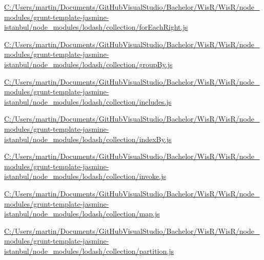 \begin{DoxyCompactItemize}
\item 
\hyperlink{_c_1_2_users_2martin_2_documents_2_git_hub_visual_studio_2_bachelor_2_wis_r_2_wis_r_2node_module4e21f2b488b14f7d27ff100a4e449020}{C\+:/\+Users/martin/\+Documents/\+Git\+Hub\+Visual\+Studio/\+Bachelor/\+Wis\+R/\+Wis\+R/node\+\_\+modules/grunt-\/template-\/jasmine-\/istanbul/node\+\_\+modules/lodash/collection/for\+Each\+Right.\+js}
\item 
\hyperlink{_c_1_2_users_2martin_2_documents_2_git_hub_visual_studio_2_bachelor_2_wis_r_2_wis_r_2node_modulebb2605923cf83369f244132dd77857ae}{C\+:/\+Users/martin/\+Documents/\+Git\+Hub\+Visual\+Studio/\+Bachelor/\+Wis\+R/\+Wis\+R/node\+\_\+modules/grunt-\/template-\/jasmine-\/istanbul/node\+\_\+modules/lodash/collection/group\+By.\+js}
\item 
\hyperlink{_c_1_2_users_2martin_2_documents_2_git_hub_visual_studio_2_bachelor_2_wis_r_2_wis_r_2node_moduleaa2cefc786c7d8a6bf6cf943f6676680}{C\+:/\+Users/martin/\+Documents/\+Git\+Hub\+Visual\+Studio/\+Bachelor/\+Wis\+R/\+Wis\+R/node\+\_\+modules/grunt-\/template-\/jasmine-\/istanbul/node\+\_\+modules/lodash/collection/includes.\+js}
\item 
\hyperlink{_c_1_2_users_2martin_2_documents_2_git_hub_visual_studio_2_bachelor_2_wis_r_2_wis_r_2node_module82b56fa66cc5621d63134b5321fbb478}{C\+:/\+Users/martin/\+Documents/\+Git\+Hub\+Visual\+Studio/\+Bachelor/\+Wis\+R/\+Wis\+R/node\+\_\+modules/grunt-\/template-\/jasmine-\/istanbul/node\+\_\+modules/lodash/collection/index\+By.\+js}
\item 
\hyperlink{_c_1_2_users_2martin_2_documents_2_git_hub_visual_studio_2_bachelor_2_wis_r_2_wis_r_2node_module914b3952031e205e0056087a30765cb4}{C\+:/\+Users/martin/\+Documents/\+Git\+Hub\+Visual\+Studio/\+Bachelor/\+Wis\+R/\+Wis\+R/node\+\_\+modules/grunt-\/template-\/jasmine-\/istanbul/node\+\_\+modules/lodash/collection/invoke.\+js}
\item 
\hyperlink{_c_1_2_users_2martin_2_documents_2_git_hub_visual_studio_2_bachelor_2_wis_r_2_wis_r_2node_moduled8aa02644561551e8cdd286f229f0b7a}{C\+:/\+Users/martin/\+Documents/\+Git\+Hub\+Visual\+Studio/\+Bachelor/\+Wis\+R/\+Wis\+R/node\+\_\+modules/grunt-\/template-\/jasmine-\/istanbul/node\+\_\+modules/lodash/collection/map.\+js}
\item 
\hyperlink{_c_1_2_users_2martin_2_documents_2_git_hub_visual_studio_2_bachelor_2_wis_r_2_wis_r_2node_module516d2b4c5b5f0bdf021f04c674aa41b9}{C\+:/\+Users/martin/\+Documents/\+Git\+Hub\+Visual\+Studio/\+Bachelor/\+Wis\+R/\+Wis\+R/node\+\_\+modules/grunt-\/template-\/jasmine-\/istanbul/node\+\_\+modules/lodash/collection/partition.\+js}

\end{DoxyCompactItemize}
